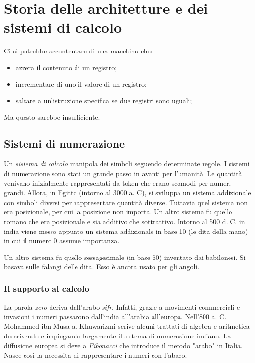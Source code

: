 \chapter{Storia delle architetture e dei sistemi di calcolo}

Ci si potrebbe accontentare di una macchina che:

\begin{itemize}
    \item azzera il contenuto di un registro;
    \item incrementare di uno il valore di un registro;
    \item saltare a un'istruzione specifica se due registri sono uguali;
\end{itemize}

Ma questo sarebbe insufficiente.

\section{Sistemi di numerazione}

Un \textit{sistema di calcolo} manipola dei simboli seguendo determinate regole. I sistemi di numerazione sono stati un grande passo in avanti per l'umanità. Le quantità venivano inizialmente rappresentati da token che erano scomodi per numeri grandi. Allora, in Egitto (intorno al 3000 a. C), si sviluppa un sistema addizionale con simboli diversi per rappresentare quantità diverse. Tuttavia quel sistema non era posizionale, per cui la posizione non importa. Un altro sistema fu quello romano che era posizionale e sia additivo che sottrattivo. Intorno al 500 d. C. in india viene messo appunto un sistema addizionale in base 10 (le dita della mano) in cui il numero 0 assume importanza.

Un altro sistema fu quello sessagesimale (in base 60) inventato dai babilonesi. Si basava sulle falangi delle dita. Esso è ancora usato per gli angoli.

\subsection{Il supporto al calcolo}

La parola \textit{zero} deriva dall'arabo \textit{sifr}. Infatti, grazie a movimenti commerciali e invasioni i numeri passarono dall'india all'arabia all'europa. Nell'800 a. C. Mohammed ibn-Musa al-Khuwarizmi scrive
alcuni trattati di algebra e aritmetica descrivendo e impiegando
largamente il sistema di numerazione indiano. La diffusione europea si deve a \textit{Fibonacci} che introduce il metodo "arabo" in Italia. Nasce così la necessita di rappresentare i numeri con l'abaco.

